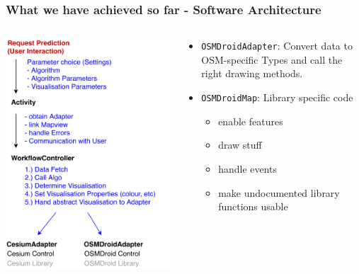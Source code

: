 \documentclass[xcolor=dvipsnames]{beamer}
\begin{document}
\begin{frame}
	\frametitle{What we have achieved so far - Software Architecture}
	\begin{columns}
	\begin{column}{0.5\textwidth}
		\includegraphics[width=\textwidth]{diagrams/controller-flow.pdf}
	\end{column}
	\begin{column}{0.5\textwidth}
		\fontsize{9pt}{7.2}\selectfont
		\begin{itemize} 
		 	 \item \lstinline$OSMDroidAdapter$: Convert data to OSM-specific Types and call the right drawing methods.
		 	 \item \lstinline$OSMDroidMap$: Library specific code %
		 	 \begin{itemize} 
		 	  	 \item enable features
		 	  	 \item draw stuff
		 	  	 \item handle events 
		 	  	 \item make undocumented library functions usable
		 	 \end{itemize} 
		\end{itemize} 
 	\end{column}
	\end{columns}
\end{frame}
\end{document}
